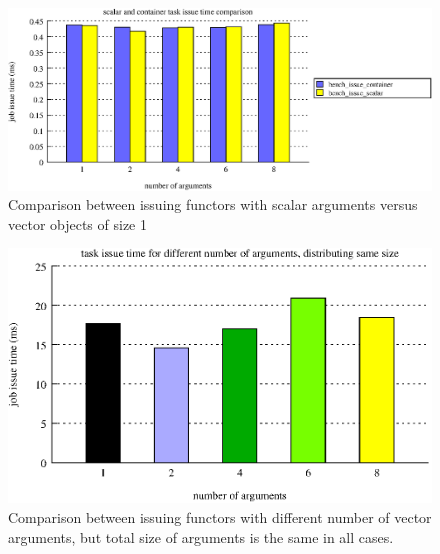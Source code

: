 \begin{figure}[!ht]
\includegraphics[width=\columnwidth]{figures/job_issue_time_scalar_vs_container_bars}
\caption{Comparison between issuing functors with scalar arguments versus vector objects of size 1}
\label{fig:issue_time_scalar_vs_containers}
\end{figure}

\begin{figure}[!ht]
\includegraphics[width=0.7\columnwidth]{figures/job_issue_time_different_argnums_same_size_bars}
\caption{Comparison between issuing functors with different number of vector arguments, but total 
				size of arguments is the same in all cases.}
\label{fig:issue_time_different_argnum_same_size}
\end{figure}


